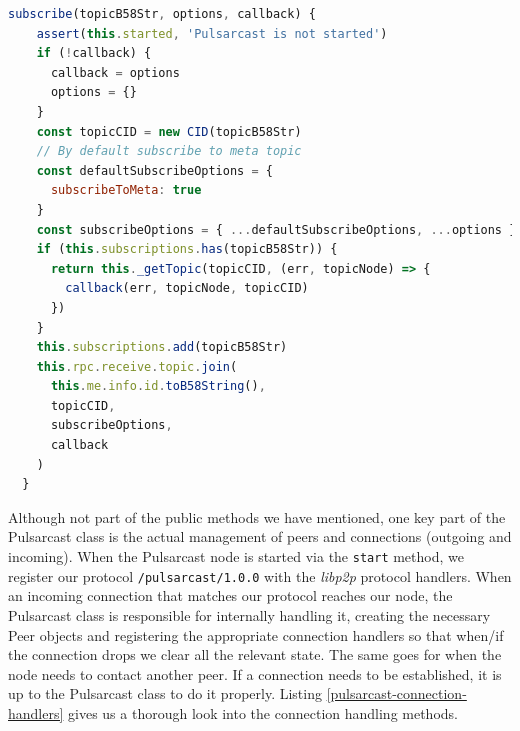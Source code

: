 \begin{lstlisting}[language=JavaScript, float, caption={Pulsarcast class subscribe method},label={pulsarcast-subscribe}]
  subscribe(topicB58Str, options, callback) {
    assert(this.started, 'Pulsarcast is not started')
    if (!callback) {
      callback = options
      options = {}
    }
    const topicCID = new CID(topicB58Str)
    // By default subscribe to meta topic
    const defaultSubscribeOptions = {
      subscribeToMeta: true
    }
    const subscribeOptions = { ...defaultSubscribeOptions, ...options }
    if (this.subscriptions.has(topicB58Str)) {
      return this._getTopic(topicCID, (err, topicNode) => {
        callback(err, topicNode, topicCID)
      })
    }
    this.subscriptions.add(topicB58Str)
    this.rpc.receive.topic.join(
      this.me.info.id.toB58String(),
      topicCID,
      subscribeOptions,
      callback
    )
  }
\end{lstlisting}

Although not part of the public methods we have mentioned, one key part of the
Pulsarcast class is the actual management of peers and connections (outgoing
and incoming). When the Pulsarcast node is started via the \verb|start| method,
we register our protocol \verb|/pulsarcast/1.0.0| with the \emph{libp2p}
protocol handlers. When an incoming connection that matches our protocol
reaches our node, the Pulsarcast class is responsible for internally handling
it, creating the necessary Peer objects and registering the appropriate
connection handlers so that when/if the connection drops we clear all the
relevant state. The same goes for when the node needs to contact another peer.
If a connection needs to be established, it is up to the Pulsarcast class to do
it properly. Listing \ref{pulsarcast-connection-handlers} gives us a thorough
look into the connection handling methods.

